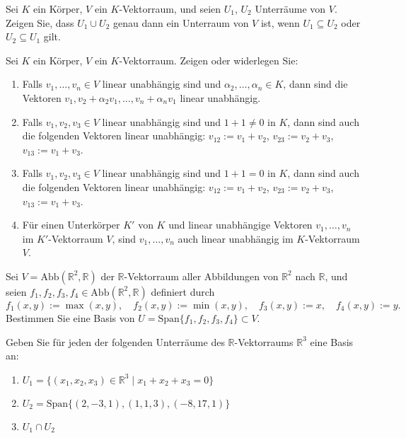 \documentclass{../problemset}
\author{Michael van Straten}
\begin{document}
\maketitle

\begin{problem}
Sei $K$ ein Körper, $V$ ein $K$-Vektorraum, und seien $U_1$, $U_2$ Unterräume von $V$. Zeigen Sie, dass $U_1 \cup U_2$ genau dann ein Unterraum von $V$ ist, wenn $U_1 \subseteq U_2$ oder $U_2 \subseteq U_1$ gilt.
\end{problem}

\begin{problem}
Sei $K$ ein Körper, $V$ ein $K$-Vektorraum. Zeigen oder widerlegen Sie:
\begin{enumerate}
    \item Falls $v_1, \ldots, v_n \in V$ linear unabhängig sind und $\alpha_2, \ldots, \alpha_n \in K$, dann sind die Vektoren $v_1, v_2 + \alpha_2v_1, \ldots, v_n + \alpha_nv_1$ linear unabhängig.
    \item Falls $v_1, v_2, v_3 \in V$ linear unabhängig sind und $1 + 1 \neq 0$ in $K$, dann sind auch die folgenden Vektoren linear unabhängig: $v_{12} := v_1 + v_2$, $v_{23} := v_2 + v_3$, $v_{13} := v_1 + v_3$.
    \item Falls $v_1, v_2, v_3 \in V$ linear unabhängig sind und $1 + 1 = 0$ in $K$, dann sind auch die folgenden Vektoren linear unabhängig: $v_{12} := v_1 + v_2$, $v_{23} := v_2 + v_3$, $v_{13} := v_1 + v_3$.
    \item Für einen Unterkörper $K'$ von $K$ und linear unabhängige Vektoren $v_1, \ldots, v_n$ im $K'$-Vektorraum $V$, sind $v_1, \ldots, v_n$ auch linear unabhängig im $K$-Vektorraum $V$.
\end{enumerate}
\end{problem}

\begin{problem}
Sei $V = \text{Abb}(\mathbb{R}^2, \mathbb{R})$ der $\mathbb{R}$-Vektorraum aller Abbildungen von $\mathbb{R}^2$ nach $\mathbb{R}$, und seien $f_1, f_2, f_3, f_4 \in \text{Abb}(\mathbb{R}^2, \mathbb{R})$ definiert durch
\[ f_1(x, y) := \max(x, y), \quad f_2(x, y) := \min(x, y), \quad f_3(x, y) := x, \quad f_4(x, y) := y. \]
Bestimmen Sie eine Basis von $U = \text{Span}\{f_1, f_2, f_3, f_4\} \subset V$.
\end{problem}

\pagebreak

\begin{problem}
Geben Sie für jeden der folgenden Unterräume des $\mathbb{R}$-Vektorraums $\mathbb{R}^3$ eine Basis an:
\begin{enumerate}
    \item $U_1 = \{(x_1, x_2, x_3) \in \mathbb{R}^3 \mid x_1 + x_2 + x_3 = 0\}$
    \item $U_2 = \text{Span}\{(2, -3, 1), (1, 1, 3), (-8, 17, 1)\}$
    \item $U_1 \cap U_2$
\end{enumerate}
\end{problem}
\end{document}
